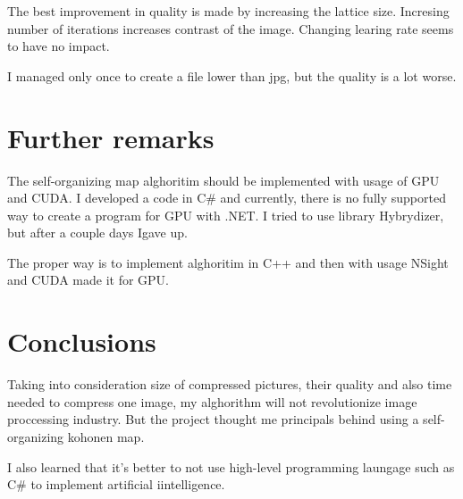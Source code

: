 \documentclass[12pt,a4paper]{article}
\begin{document}
The best improvement in quality is made by increasing the lattice size. Incresing number of iterations increases contrast of the image. Changing learing rate seems to have no impact.

I managed only once to create a file lower than jpg, but the quality is a lot worse.

\section{Further remarks}
The self-organizing map alghoritim should be implemented with usage of GPU and CUDA. I developed a code in C\# and currently, there is no fully supported way to create a program for GPU with .NET. I tried to use library Hybrydizer, but after a couple days Igave up.

The proper way is to implement alghoritim in C++ and then with usage NSight and CUDA made it for GPU.
\section{Conclusions}
Taking into consideration size of compressed pictures, their quality and also time needed to compress one image, my alghorithm will not revolutionize image proccessing industry. But the project thought me principals behind using a self-organizing kohonen map.

I also learned that it's better to not use high-level programming laungage such as C\# to implement artificial iintelligence.
\end{document}
